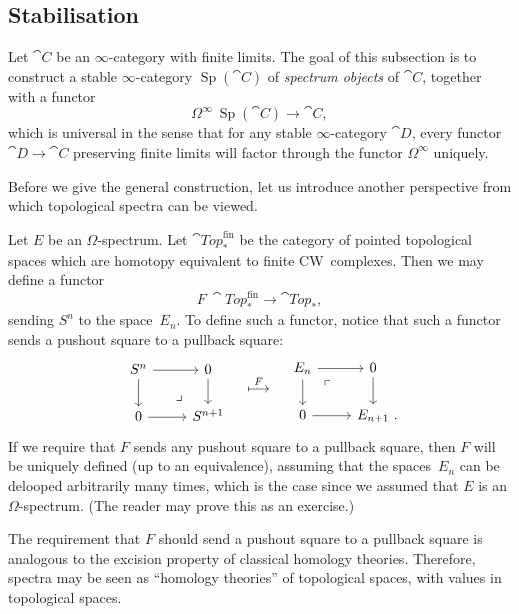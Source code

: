\subsection{Stabilisation}

Let $\cat C$ be an $\infty$-category with finite limits.
The goal of this subsection is to construct
a stable $\infty$-category $\operatorname{Sp}(\cat{C})$ of \emph{spectrum objects} of $\cat C$,
together with a functor
\[\Omega^\infty\:\operatorname{Sp}(\cat{C})\to\cat{C},\]
which is universal in the sense that for any stable $\infty$-category $\cat D$,
every functor $\cat{D}\to\cat{C}$ preserving finite limits 
will factor through the functor $\Omega^\infty$ uniquely.

Before we give the general construction, 
let us introduce another perspective
from which topological spectra can be viewed.

Let $E$ be an $\Omega$-spectrum.
Let $\cat{Top}_*^{\mathrm{fin}}$ be the category 
of pointed topological spaces which are homotopy equivalent
to finite CW~complexes.
Then we may define a functor 
\[F\:\cat{Top}_*^{\mathrm{fin}}\to\cat{Top}_*,\]
sending $S^n$ to the space~$E_n$.
To define such a functor,
notice that such a functor sends a pushout square to a pullback square:
\[\begin{tikzcd}
    S^n\ar[r]\ar[d]\ar[dr,phantom,pos=.75,"\lrcorner"] & 0\ar[d] \\
    0\ar[r] & S^{n+1}
\end{tikzcd}
\quad\overset{F}{\longmapsto}\quad
\begin{tikzcd}
    E_n\ar[r]\ar[d]\ar[dr,phantom,pos=.25,"\ulcorner"] & 0\ar[d] \\
    0\ar[r] & E_{n+1}\rlap{\ .}
\end{tikzcd}\]
If we require that $F$ sends any pushout square to a pullback square,
then $F$ will be uniquely defined (up to an equivalence),
assuming that the spaces~$E_n$ can be delooped arbitrarily many times,
which is the case since we assumed that $E$ is an $\Omega$-spectrum.
(The reader may prove this as an exercise.)

The requirement that $F$ should send a pushout square to a pullback square
is analogous to the excision property of classical homology theories.
Therefore, spectra may be seen as ``homology theories'' of topological spaces,
with values in topological spaces.

